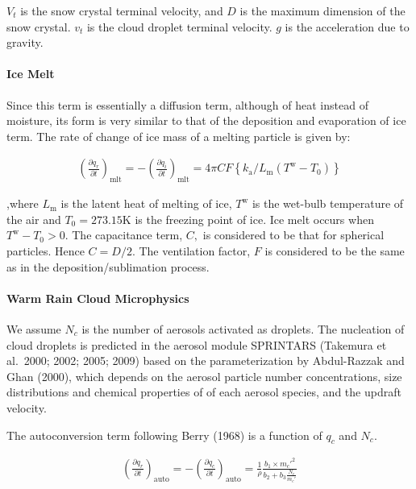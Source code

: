 \(V_{t}\) is the snow crystal terminal velocity, and \(D\) is the maximum dimension of the snow crystal. \(v_{t}\) is the cloud droplet terminal velocity. \(g\) is the acceleration due to gravity.

\hypertarget{ice-melt}{%
\paragraph{Ice Melt}\label{ice-melt}}

Since this term is essentially a diffusion term, although of heat instead of moisture, its form is very similar to that of the deposition and evaporation of ice term. The rate of change of ice mass of
a melting particle is given by:

\begin{eqnarray}
\left(\frac{\partial q_r}{\partial t}\right)_{\text {mlt}}
=-\left(\frac{\partial q_i}{\partial t}\right)_{\text {mlt}}
=4 \pi C F\left\{k_{\mathrm{a}} / L_{\mathrm{m}}\left(T^{\mathrm{w}}-T_{0}\right)\right\}
\end{eqnarray}

,where \(L_{\mathrm{m}}\) is the latent heat of melting of ice, \(T^{\mathrm{w}}\) is the wet-bulb temperature of the air and \(T_{0}=273.15\mathrm{K}\) is the freezing point of ice. Ice melt occurs
when \(T^{\mathrm{w}}-T_{0}>0\). The capacitance term, \(C,\) is considered to be that for spherical particles. Hence \(C=D / 2 .\) The ventilation factor, \(F\) is considered to be the same as in the
deposition/sublimation process.

\hypertarget{warm-rain-cloud-microphysics}{%
\paragraph{Warm Rain Cloud Microphysics}\label{warm-rain-cloud-microphysics}}

We assume \(N_c\) is the number of aerosols activated as droplets. The nucleation of cloud droplets is predicted in the aerosol module SPRINTARS (Takemura et al.~2000; 2002; 2005; 2009) based on the
parameterization by Abdul-Razzak and Ghan (2000), which depends on the aerosol particle number concentrations, size distributions and chemical properties of of each aerosol species, and the updraft
velocity.

The autoconversion term following Berry (1968) is a function of \(q_c\) and \(N_c\).

\begin{eqnarray}
\left(\frac{\partial q_r}{\partial t}\right)_{\text {auto}}
=-\left(\frac{\partial q_c}{\partial t}\right)_{\text {auto}}
=\frac{1}{\rho}
\frac{b_1 \times m_{c}'^{2}}{b_2+b_3 \frac{N_{c}}{m_{c}'}}
\end{eqnarray}

